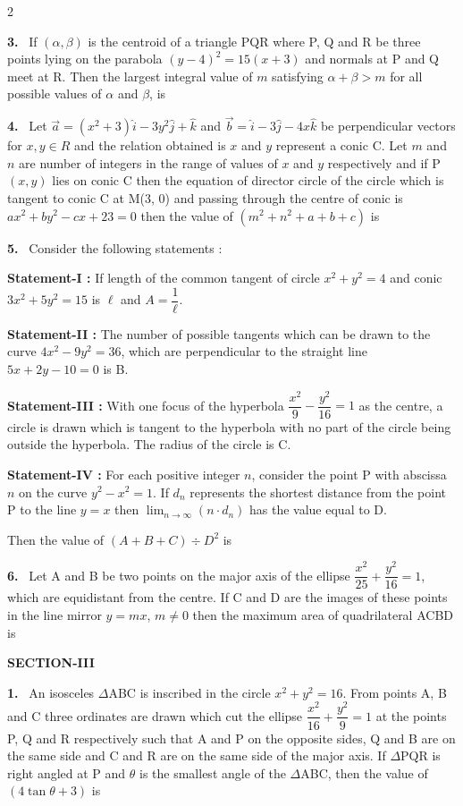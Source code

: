 \documentclass[10pt]{extarticle}
\newcommand{\sect}[1]{\par\smallskip\noindent\textbf{#1}\par}
\newcommand{\qn}[1]{\par\smallskip\noindent\textbf{#1.}~}
\begin{document}
\begin{multicols}{2}
\qn{3} If $(\alpha,\beta)$ is the centroid of a triangle PQR where P, Q and R be three points lying on the parabola $(y-4)^2=15(x+3)$ and normals at P and Q meet at R. Then the largest integral value of $m$ satisfying $\alpha+\beta>m$ for all possible values of $\alpha$ and $\beta$, is
\qn{4} Let $\vec a=(x^2+3)\hat i-3y^2\hat j+\hat k$ and $\vec b=\hat i-3\hat j-4x\hat k$ be perpendicular vectors for $x,y\in R$ and the relation obtained is $x$ and $y$ represent a conic C. Let $m$ and $n$ are number of integers in the range of values of $x$ and $y$ respectively and if P$(x,y)$ lies on conic C then the equation of director circle of the circle which is tangent to conic C at M(3, 0) and passing through the centre of conic is $ax^2+by^2-cx+23=0$ then the value of $(m^2+n^2+a+b+c)$ is
\qn{5} Consider the following statements :\par
\textbf{Statement-I :} If length of the common tangent of circle $x^2+y^2=4$ and conic $3x^2+5y^2=15$ is $\ell$ and $A=\dfrac1\ell$.\par
\textbf{Statement-II :} The number of possible tangents which can be drawn to the curve $4x^2-9y^2=36$, which are perpendicular to the straight line $5x+2y-10=0$ is B.\par
\textbf{Statement-III :} With one focus of the hyperbola $\dfrac{x^2}{9}-\dfrac{y^2}{16}=1$ as the centre, a circle is drawn which is tangent to the hyperbola with no part of the circle being outside the hyperbola. The radius of the circle is C.\par
\textbf{Statement-IV :} For each positive integer $n$, consider the point P with abscissa $n$ on the curve $y^2-x^2=1$. If $d_n$ represents the shortest distance from the point P to the line $y=x$ then $\displaystyle\lim_{n\to\infty}(n\cdot d_n)$ has the value equal to D.\par
Then the value of $(A+B+C)\div D^2$ is
\qn{6} Let A and B be two points on the major axis of the ellipse $\dfrac{x^2}{25}+\dfrac{y^2}{16}=1$, which are equidistant from the centre. If C and D are the images of these points in the line mirror $y=mx$, $m\neq0$ then the maximum area of quadrilateral ACBD is
\sect{SECTION-III}
\qn{1} An isosceles $\Delta$ABC is inscribed in the circle $x^2+y^2=16$. From points A, B and C three ordinates are drawn which cut the ellipse $\dfrac{x^2}{16}+\dfrac{y^2}{9}=1$ at the points P, Q and R respectively such that A and P on the opposite sides, Q and B are on the same side and C and R are on the same side of the major axis. If $\Delta$PQR is right angled at P and $\theta$ is the smallest angle of the $\Delta$ABC, then the value of $(4\tan\theta+3)$ is

\end{multicols}
\end{document}
